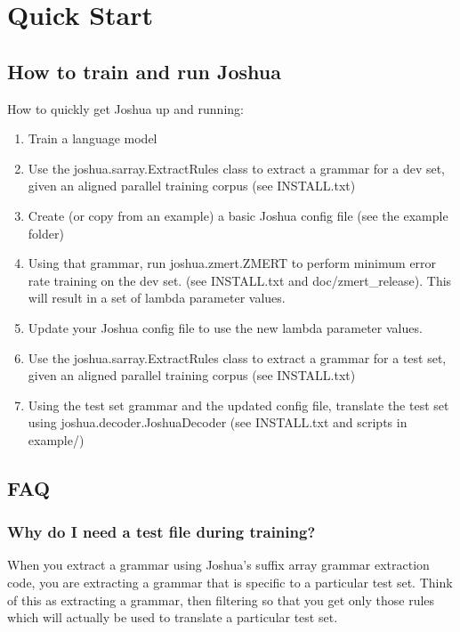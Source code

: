 \chapter{Quick Start}

\section{How to train and run Joshua}

How to quickly get Joshua up and running:

 \begin{enumerate}
 \item Train a language model
 \item Use the joshua.sarray.ExtractRules class to extract a grammar for a dev set, given an aligned parallel training corpus (see INSTALL.txt)
 \item Create (or copy from an example) a basic Joshua config file (see the example folder)
 \item Using that grammar, run joshua.zmert.ZMERT to perform minimum error rate training on the dev set. (see INSTALL.txt and doc/zmert\_release). This will result in a set of lambda parameter values.
\item Update your Joshua config file to use the new lambda parameter values.
\item Use the joshua.sarray.ExtractRules class to extract a grammar for a test set, given an aligned parallel training corpus (see INSTALL.txt)
\item Using the test set grammar and the updated config file, translate the test set using joshua.decoder.JoshuaDecoder (see INSTALL.txt and scripts in example/)
 \end{enumerate}


\section{FAQ}

\subsection{Why do I need a test file during training?}

When you extract a grammar using Joshua's suffix array grammar extraction code, you are extracting a grammar that is specific to a particular test set. Think of this as extracting a grammar, then filtering so that you get only those rules which will actually be used to translate a particular test set.

